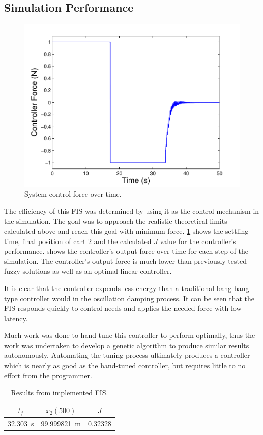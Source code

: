 \subsection{Simulation Performance}\label{ss:simperf}
\begin{figure}[h]
    \centering
\includegraphics[width=0.8\linewidth]{images/FuzzyForcePlot.pdf} \caption{System control force over time.} \label{f:forceplot}
\end{figure}


The efficiency of this FIS was determined by using it as the control mechanism in the simulation. The goal was
to approach the realistic theoretical limits calculated above and reach this goal with minimum force.
\cref{tab:finalres} shows the settling time, final position of cart 2 and the calculated $J$ value for
the controller's performance.  shows the controller's output force over time for each
step of the simulation. The controller's output force is much lower than previously tested fuzzy solutions as
well as an optimal linear controller.

It is clear that the controller expends less energy than a traditional bang-bang type controller would in the
oscillation damping process. It can be seen that the FIS responds quickly to control needs and applies the
needed force with low-latency. 

Much work was done to hand-tune this controller to perform optimally, thus the work was undertaken to develop
a genetic algorithm to produce similar results autonomously. Automating the tuning process ultimately produces
a controller which is nearly as good as the hand-tuned controller, but requires little to no effort from the
programmer.

\begin{table} \centering \caption{Results from implemented FIS.} \label{tab:finalres} \begin{tabular}{|c|c|c|}
\hline $t_f$ & $x_2(500)$ & $J$ \\ \hline \SI{32.303}{\second} & \SI{99.999821}{\metre} & 0.32328 \\ \hline
\end{tabular} \end{table}

